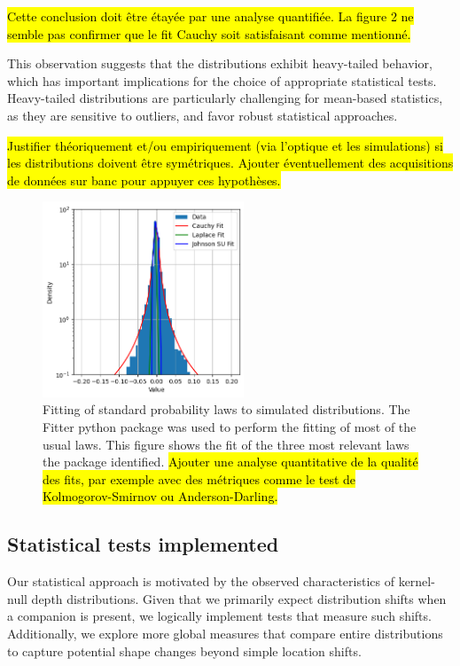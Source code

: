 \documentclass{article}
\begin{document}
\hl{Cette conclusion doit être étayée par une analyse quantifiée. La figure 2 ne semble pas confirmer que le fit Cauchy soit satisfaisant comme mentionné.}

This observation suggests that the distributions exhibit heavy-tailed behavior, which has important implications for the choice of appropriate statistical tests. Heavy-tailed distributions are particularly challenging for mean-based statistics, as they are sensitive to outliers, and favor robust statistical approaches.

\hl{Justifier théoriquement et/ou empiriquement (via l'optique et les simulations) si les distributions doivent être symétriques. Ajouter éventuellement des acquisitions de données sur banc pour appuyer ces hypothèses.}

\begin{figure}[H]
\centering
\includegraphics[width=6cm]{img/fits.png}
\caption{Fitting of standard probability laws to simulated distributions. The Fitter python package was used to perform the fitting of most of the usual laws. This figure shows the fit of the three most relevant laws the package identified. \hl{Ajouter une analyse quantitative de la qualité des fits, par exemple avec des métriques comme le test de Kolmogorov-Smirnov ou Anderson-Darling.}}
\label{fig:fits}
\end{figure}

\subsection{Statistical tests implemented}

Our statistical approach is motivated by the observed characteristics of kernel-null depth distributions. Given that we primarily expect distribution shifts when a companion is present, we logically implement tests that measure such shifts. Additionally, we explore more global measures that compare entire distributions to capture potential shape changes beyond simple location shifts.
\end{document}
